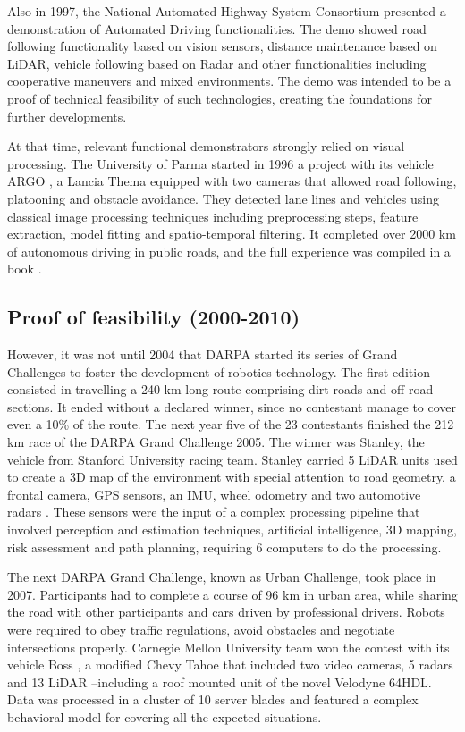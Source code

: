 Also in 1997, the National Automated Highway System Consortium presented a 
demonstration of Automated Driving functionalities\cite{Thorpe1997}. The demo 
showed road following functionality based on vision sensors, distance 
maintenance based on LiDAR, vehicle following based on Radar and other 
functionalities including cooperative maneuvers and mixed environments. The 
demo was intended to be a proof of technical feasibility of such technologies, 
creating the foundations for further developments. 

At that time, relevant functional demonstrators strongly relied on visual 
processing. The University of Parma started in 1996 a project with its vehicle 
ARGO \cite{Broggi1998}, a Lancia Thema equipped with two cameras that allowed 
road following, platooning and obstacle avoidance. They detected lane lines and 
vehicles using classical image processing techniques including preprocessing 
steps, feature extraction, model fitting and spatio-temporal filtering.
It completed over 2000 km of autonomous driving in public roads, and the full 
experience was compiled in a book \cite{Broggi1999}.

\subsection{Proof of feasibility (2000-2010)}

However, it was not until 2004 that DARPA started its series of Grand 
Challenges to foster the development of robotics technology. The first edition 
consisted in travelling a 240 km long route comprising dirt roads and off-road 
sections. It ended without a declared winner, since no contestant manage to 
cover even a 10\% of the route. The next year five of the 23 contestants 
finished the 212 km race of the DARPA Grand Challenge 2005. The winner was 
Stanley, the vehicle from Stanford University racing team. Stanley carried 5 
LiDAR units used to create a 3D map of the environment with special attention 
to road geometry, a frontal camera, GPS sensors, an IMU, wheel odometry and two 
automotive radars \cite{Thrun2006}. These sensors were the input of a 
complex processing pipeline that involved perception and estimation techniques, 
artificial intelligence, 3D mapping, risk assessment and path planning, 
requiring 6 computers to do the processing. 

The next DARPA Grand Challenge, known as Urban Challenge, took place in 2007. Participants had to complete a course of 96 km in urban area, while sharing the road with other participants and cars driven by professional drivers. Robots were required to obey traffic regulations, avoid obstacles and negotiate intersections properly. Carnegie Mellon University team won the contest with its vehicle Boss \cite{TartanRacing2005}, a modified Chevy Tahoe that included two video cameras, 5 radars and 13 LiDAR --including a roof mounted unit of the novel Velodyne 64HDL. Data was processed in a cluster of 10 server blades and featured a complex behavioral model \cite{Urmson2007} for covering all the expected situations.

